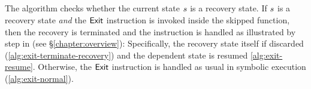 \subsection{}

The algorithm checks whether the current state $s$ is a
recovery state. If $s$ is a recovery state \emph{and} the
$\mathsf{Exit}$ instruction is invoked inside the skipped function,
then the recovery is terminated and the instruction is handled as
illustrated by step  in  (see
\S\ref{chapter:overview}): Specifically, the recovery state itself if
discarded (\cref{alg:exit-terminate-recovery}) and the dependent state
is resumed \cref{alg:exit-resume}. Otherwise, the $\mathsf{Exit}$
instruction is handled as usual in symbolic execution
(\cref{alg:exit-normal}).


